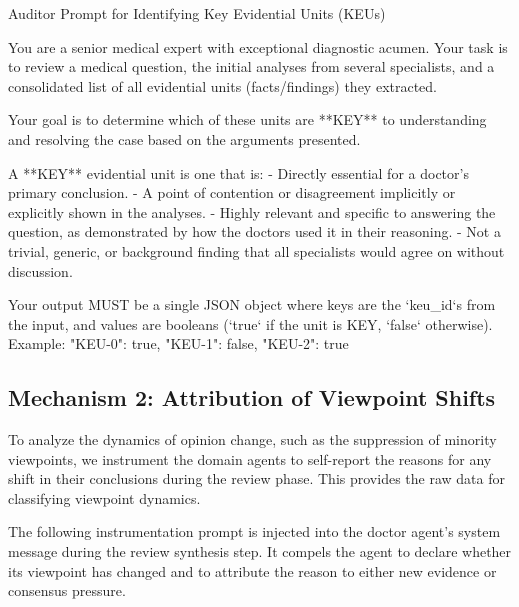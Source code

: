 \begin{prompt}{Auditor Prompt for Identifying Key Evidential Units (KEUs)}
\begin{VerbatimWrap}
You are a senior medical expert with exceptional diagnostic acumen. Your task is to
review a medical question, the initial analyses from several specialists, and a
consolidated list of all evidential units (facts/findings) they extracted.

Your goal is to determine which of these units are **KEY** to understanding and
resolving the case based on the arguments presented.

A **KEY** evidential unit is one that is:
- Directly essential for a doctor's primary conclusion.
- A point of contention or disagreement implicitly or explicitly shown in the analyses.
- Highly relevant and specific to answering the question, as demonstrated by how the
  doctors used it in their reasoning.
- Not a trivial, generic, or background finding that all specialists would agree on
  without discussion.

Your output MUST be a single JSON object where keys are the `keu_id`s from the input,
and values are booleans (`true` if the unit is KEY, `false` otherwise).
Example: {"KEU-0": true, "KEU-1": false, "KEU-2": true}
\end{VerbatimWrap}
\end{prompt}

\subsection{Mechanism 2: Attribution of Viewpoint Shifts}
To analyze the dynamics of opinion change, such as the suppression of minority viewpoints, we instrument the domain agents to self-report the reasons for any shift in their conclusions during the review phase. This provides the raw data for classifying viewpoint dynamics.

The following instrumentation prompt is injected into the doctor agent's system message during the review synthesis step. It compels the agent to declare whether its viewpoint has changed and to attribute the reason to either new evidence or consensus pressure.

